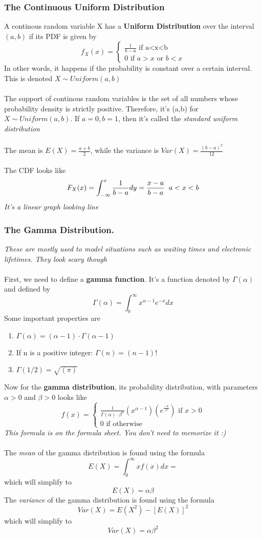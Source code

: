 \documentclass{article}
\begin{document}
\subsubsection{The Continuous Uniform Distribution}
A continous random variable X has a \textbf{Uniform Distribution} over the interval $(a,b)$ if its PDF is given by
\[f_X(x)=
\begin{cases}
\frac{1}{b-a}\text{ if a<x<b}\\
0\text{ if } a>x\text{ or } b<x
\end{cases}\]
In other words, it happens if the probability is constant over a certain interval. This is denoted $X \sim Uniform(a,b)$\\\\
The support of continous random variables is the set of all numbers whose probability density is strictly positive. Therefore, it's (a,b) for $X \sim Uniform(a,b)$. If $a=0, b=1$, then it's called the \textit{standard uniform distribution}\\\\
The mean is $E(X)=\frac{a+b}{2}$, while the variance is $Var(X)=\frac{(b-a)^2}{12}$\\\\
The CDF looks like 
\[F_X(x)=\int^x_{-\infty}\frac{1}{b-a}dy=\frac{x-a}{b-a}\hspace{2mm}a<x<b\]
\textit{It's a linear graph looking line}
\subsubsection{The Gamma Distribution.}
\textit{These are mostly used to model situations such as waiting times and electronic lifetimes. They look scary though}\\\\
First, we need to define a \textbf{gamma function}. It's a function denoted by $\Gamma(\alpha)$ and defined by
\[\Gamma(\alpha)=\int^\infty_0x^{\alpha-1}e^{-x}dx\]
Some important properties are
\begin{enumerate}
    \item $\Gamma(\alpha)=(\alpha-1)\cdot\Gamma(\alpha-1)$
    \item If n is a positive integer: $\Gamma(n)=(n-1)!$
    \item $\Gamma(1/2)=\sqrt{(\pi)}$
\end{enumerate}
Now for the \textbf{gamma distribution}, its probability distribution, with parameters $\alpha>0$ and $\beta>0$ looks like
\[
f(x)=
\begin{cases}
    \frac{1}{\Gamma(\alpha)\cdot\beta^\alpha}(x^{\alpha-1})(e^\frac{-x}{\beta})\text{ if }x > 0\\
    0 \text{ if otherwise}
\end{cases}
\]
\textit{This formula is on the formula sheet. You don't need to memorize it :)}\\\\
The \textit{mean} of the gamma distribution is found using the formula
\[E(X)=\int^\infty_0xf(x)dx=\]
which will simplify to
\[E(X)=\alpha\beta\]
The \textit{variance} of the gamma distribution is found using the formula
\[Var(X) = E(X^2)-[E(X)]^2\]
which will simplify to 
\[Var(X) = \alpha\beta^2\]
\end{document}
